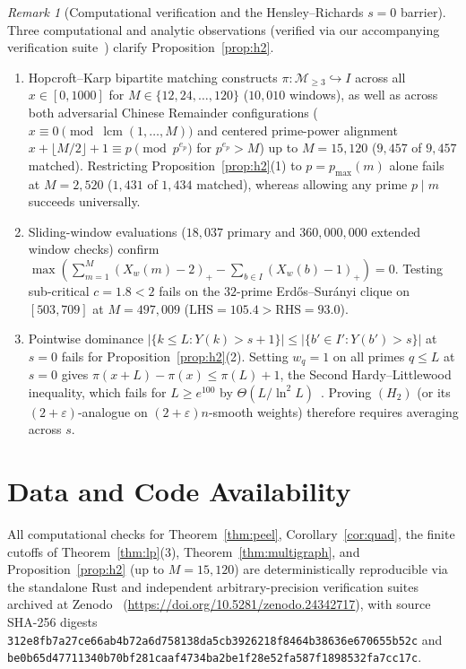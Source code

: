 \documentclass[11pt]{article}
\theoremstyle{remark}
\newtheorem{remark}[theorem]{Remark}
\DeclareMathOperator{\lcm}{lcm}
\begin{document}
\begin{remark}[Computational verification and the Hensley--Richards $s = 0$ barrier]
Three computational and analytic observations (verified via our accompanying verification suite~\cite{bergstrom26code}) clarify Proposition~\ref{prop:h2}.
\begin{enumerate}
\item Hopcroft--Karp bipartite matching constructs $\pi : \mathcal{M}_{\ge 3} \hookrightarrow I$ across all $x \in [0, 1000]$ for $M \in \{12, 24, \dots, 120\}$ ($10{,}010$ windows), as well as across both adversarial Chinese Remainder configurations ($x \equiv 0 \pmod{\lcm(1, \dots, M)}$ and centered prime-power alignment $x + \lfloor M/2 \rfloor + 1 \equiv p \pmod{p^{e_p}}$ for $p^{e_p} > M$) up to $M = 15{,}120$ ($9{,}457$ of $9{,}457$ matched). Restricting Proposition~\ref{prop:h2}(1) to $p = p_{\max}(m)$ alone fails at $M = 2{,}520$ ($1{,}431$ of $1{,}434$ matched), whereas allowing any prime $p \mid m$ succeeds universally.
\item Sliding-window evaluations ($18{,}037$ primary and $360{,}000{,}000$ extended window checks) confirm $\max(\sum_{m = 1}^M (X_w(m) - 2)_+ - \sum_{b \in I} (X_w(b) - 1)_+) = 0$. Testing sub-critical $c = 1.8 < 2$ fails on the $32$-prime Erd\H{o}s--Sur\'anyi clique on $[503, 709]$ at $M = 497{,}009$ ($\mathrm{LHS} = 105.4 > \mathrm{RHS} = 93.0$).
\item Pointwise dominance $|\{k \le L : Y(k) > s + 1\}| \le |\{b' \in I' : Y(b') > s\}|$ at $s = 0$ fails for Proposition~\ref{prop:h2}(2). Setting $w_q = 1$ on all primes $q \le L$ at $s = 0$ gives $\pi(x + L) - \pi(x) \le \pi(L) + 1$, the Second Hardy--Littlewood inequality, which fails for $L \ge e^{100}$ by $\Theta(L / \ln^2 L)$~\cite{hensleyrichards74}. Proving $(H_2)$ (or its $(2 + \varepsilon)$-analogue on $(2 + \varepsilon) n$-smooth weights) therefore requires averaging across $s$.
\end{enumerate}
\end{remark}

\section*{Data and Code Availability}

All computational checks for Theorem~\ref{thm:peel}, Corollary~\ref{cor:quad}, the finite cutoffs of Theorem~\ref{thm:lp}(3), Theorem~\ref{thm:multigraph}, and Proposition~\ref{prop:h2} (up to $M = 15{,}120$) are deterministically reproducible via the standalone Rust and independent arbitrary-precision verification suites archived at Zenodo~\cite{bergstrom26code} (\url{https://doi.org/10.5281/zenodo.24342717}), with source SHA-256 digests \texttt{312e8fb7a27ce66ab4b72a6d758138da5cb3926218f8464b38636e670655b52c} and \texttt{be0b65d47711340b70bf281caaf4734ba2be1f28e52fa587f1898532fa7cc17c}.
\end{document}
